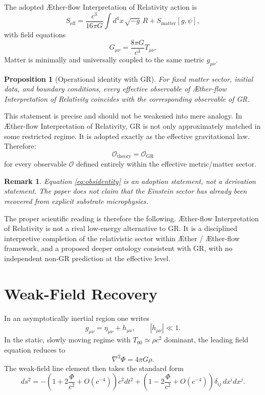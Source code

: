 \documentclass[11pt]{article}
\newcommand{\Aether}{\AE{}ther}
\newcommand{\Aflow}{\AE{}ther-flow}
\newcommand{\TheoryName}{\Aflow{} Interpretation of Relativity}
\newcommand{\TheoryProgram}{\Aether{} / \Aflow{} framework}
\newtheorem{proposition}{Proposition}
\newtheorem{remark}{Remark}
\begin{document}
The adopted \TheoryName{} action is
\begin{equation}
S_{\mathrm{eff}}
=
\frac{c^3}{16\pi G}\int d^4x\,\sqrt{-g}\,R
+
S_{\mathrm{matter}}[g,\psi],
\label{eq:SA}
\end{equation}
with field equations
\begin{equation}
G_{\mu\nu}
=
\frac{8\pi G}{c^4}T_{\mu\nu}.
\label{eq:einstein}
\end{equation}
Matter is minimally and universally coupled to the same metric \(g_{\mu\nu}\).

\begin{proposition}[Operational identity with GR]
For fixed matter sector, initial data, and boundary conditions, every effective observable of \TheoryName{} coincides with the corresponding observable of GR.
\end{proposition}

This statement is precise and should not be weakened into mere analogy. In \TheoryName{}, GR is not only approximately matched in some restricted regime. It is adopted exactly as the effective gravitational law. Therefore:
\begin{equation}
\mathcal{O}_{\mathrm{theory}}
=
\mathcal{O}_{\mathrm{GR}}
\label{eq:obsidentity}
\end{equation}
for every observable \(\mathcal{O}\) defined entirely within the effective metric/matter sector.

\begin{remark}
Equation \eqref{eq:obsidentity} is an adoption statement, not a derivation statement. The paper does not claim that the Einstein sector has already been recovered from explicit substrate microphysics.
\end{remark}

The proper scientific reading is therefore the following. \TheoryName{} is not a rival low-energy alternative to GR. It is a disciplined interpretive completion of the relativistic sector within \TheoryProgram{}, and a proposed deeper ontology consistent with GR, with no independent non-GR prediction at the effective level.

\section{Weak-Field Recovery}

In an asymptotically inertial region one writes
\begin{equation}
g_{\mu\nu}=\eta_{\mu\nu}+h_{\mu\nu},
\qquad
|h_{\mu\nu}|\ll 1.
\label{eq:linearizedmetric}
\end{equation}
In the static, slowly moving regime with \(T_{00}\simeq \rho c^2\) dominant, the leading field equation reduces to
\begin{equation}
\nabla^2\Phi = 4\pi G\rho.
\label{eq:poisson}
\end{equation}
The weak-field line element then takes the standard form
\begin{equation}
ds^2
=
-\left(1+2\frac{\Phi}{c^2}+O(c^{-4})\right)c^2dt^2
+
\left(1-2\frac{\Phi}{c^2}+O(c^{-4})\right)\delta_{ij}\,dx^i dx^j.
\label{eq:weakfield}
\end{equation}
\end{document}
